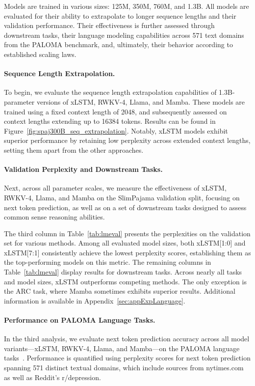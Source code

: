 Models are trained in various sizes: 125M, 350M, 760M, and 1.3B. All models are evaluated for their ability to extrapolate to longer sequence lengths and their validation performance. Their effectiveness is further assessed through downstream tasks, their language modeling capabilities across 571 text domains from the PALOMA benchmark, and, ultimately, their behavior according to established scaling laws.

\paragraph{Sequence Length Extrapolation.}
\label{sec:spaj300B_ctx_extrapolation}
To begin, we evaluate the sequence length extrapolation capabilities of 1.3B-parameter versions of xLSTM, RWKV-4, Llama, and Mamba. These models are trained using a fixed context length of 2048, and subsequently assessed on context lengths extending up to 16384 tokens. Results can be found in Figure~\ref{fig:spaj300B_seq_extrapolation}. Notably, xLSTM models exhibit superior performance by retaining low perplexity across extended context lengths, setting them apart from the other approaches.

\paragraph{Validation Perplexity and Downstream Tasks.}
\label{sec:spaj_downstream_eval}
Next, across all parameter scales, we measure the effectiveness of xLSTM, RWKV-4, Llama, and Mamba on the SlimPajama validation split, focusing on next token prediction, as well as on a set of downstream tasks designed to assess common sense reasoning abilities.

The third column in Table~\ref{tab:lmeval} presents the perplexities on the validation set for various methods. Among all evaluated model sizes, both xLSTM[1:0] and xLSTM[7:1] consistently achieve the lowest perplexity scores, establishing them as the top-performing models on this metric. The remaining columns in Table~\ref{tab:lmeval} display results for downstream tasks. Across nearly all tasks and model sizes, xLSTM outperforms competing methods. The only exception is the ARC task, where Mamba sometimes exhibits superior results. Additional information is available in Appendix~\ref{sec:appExpLanguage}.

\paragraph{Performance on PALOMA Language Tasks.} In the third analysis, we evaluate next token prediction accuracy across all model variants—xLSTM, RWKV-4, Llama, and Mamba—on the PALOMA language tasks~\citep{Magnusson:23arxivshort}. Performance is quantified using perplexity scores for next token prediction spanning 571 distinct textual domains, which include sources from nytimes.com as well as Reddit's r/depression.

